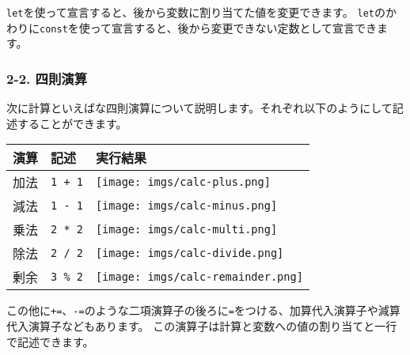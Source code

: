 \texttt{let}を使って宣言すると、後から変数に割り当てた値を変更できます。
\texttt{let}のかわりに\texttt{const}を使って宣言すると、後から変更できない定数として宣言できます。

\begin{Shaded}
\begin{Highlighting}[]
\OperatorTok{=} \OperatorTok{;}
\OperatorTok{=} \OperatorTok{;}

\OperatorTok{=} \OperatorTok{;}
\end{Highlighting}
\end{Shaded}

\subsubsection{2-2. 四則演算}\label{ux56dbux5247ux6f14ux7b97}

次に計算といえばな四則演算について説明します。それぞれ以下のようにして記述することができます。

\begin{longtable}[]{@{}lll@{}}
\toprule\noalign{}
演算 & 記述 & 実行結果 \\
\midrule\noalign{}
\endhead
\bottomrule\noalign{}
\endlastfoot
加法 & \texttt{1\ +\ 1} & \texttt{[image: imgs/calc-plus.png]} \\
減法 & \texttt{1\ -\ 1} & \texttt{[image: imgs/calc-minus.png]} \\
乗法 & \texttt{2\ *\ 2} & \texttt{[image: imgs/calc-multi.png]} \\
除法 & \texttt{2\ /\ 2} & \texttt{[image: imgs/calc-divide.png]} \\
剰余 & \texttt{3\ \%\ 2} & \texttt{[image: imgs/calc-remainder.png]} \\
\end{longtable}

この他に\texttt{+=}、\texttt{-=}のような二項演算子の後ろに\texttt{=}をつける、加算代入演算子や減算代入演算子などもあります。
この演算子は計算と変数への値の割り当てと一行で記述できます。

\begin{Shaded}
\begin{Highlighting}[]
\OperatorTok{=} \OperatorTok{;}
\OperatorTok{+=} \OperatorTok{;}
\end{Highlighting}
\end{Shaded}

